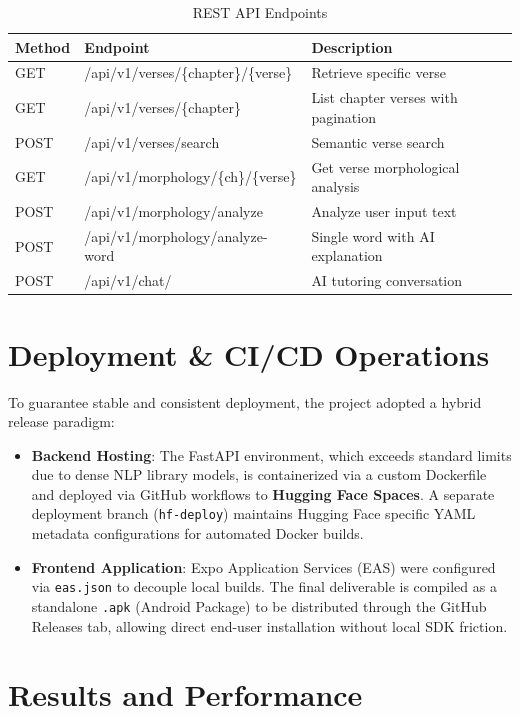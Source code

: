 \documentclass[11pt, a4paper]{article}
\begin{document}
\begin{table}[H]
\caption{REST API Endpoints}
\label{tab:api-endpoints}
\begin{tabular}{|l|l|p{6cm}|}
\toprule
\textbf{Method} & \textbf{Endpoint} & \textbf{Description} \\
\midrule
GET & /api/v1/verses/\{chapter\}/\{verse\} & Retrieve specific verse \\
GET & /api/v1/verses/\{chapter\} & List chapter verses with pagination \\
POST & /api/v1/verses/search & Semantic verse search \\
GET & /api/v1/morphology/\{ch\}/\{verse\} & Get verse morphological analysis \\
POST & /api/v1/morphology/analyze & Analyze user input text \\
POST & /api/v1/morphology/analyze-word & Single word with AI explanation \\
POST & /api/v1/chat/ & AI tutoring conversation \\
\bottomrule
\end{tabular}
\end{table}

\section{Deployment \& CI/CD Operations}

To guarantee stable and consistent deployment, the project adopted a hybrid release paradigm:

\begin{itemize}
    \item \textbf{Backend Hosting}: The FastAPI environment, which exceeds standard limits due to dense NLP library models, is containerized via a custom Dockerfile and deployed via GitHub workflows to \textbf{Hugging Face Spaces}. A separate deployment branch (\texttt{hf-deploy}) maintains Hugging Face specific YAML metadata configurations for automated Docker builds.
    \item \textbf{Frontend Application}: Expo Application Services (EAS) were configured via \texttt{eas.json} to decouple local builds. The final deliverable is compiled as a standalone \texttt{.apk} (Android Package) to be distributed through the GitHub Releases tab, allowing direct end-user installation without local SDK friction.
\end{itemize}

\section{Results and Performance}
\end{document}
